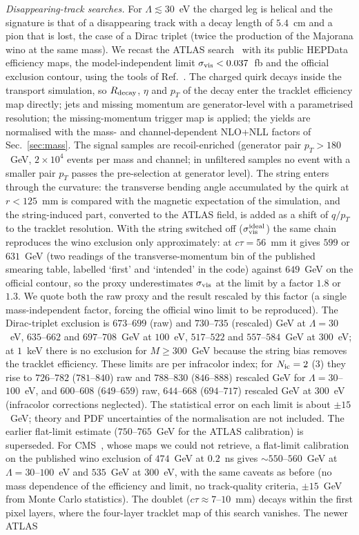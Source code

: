 \documentclass[prd,twocolumn,nofootinbib,superscriptaddress,amsmath,amssymb]{revtex4-2}
\begin{document}
\emph{Disappearing-track searches.} For $\Lambda\lesssim30$~eV the charged leg is helical and the signature is that of a disappearing track with a decay length of $5.4$~cm and a pion that is lost, the case of a Dirac triplet (twice the production of the Majorana wino at the same mass). We recast the ATLAS search~\cite{ATLAS:DT} with its public HEPData efficiency maps, the model-independent limit $\sigma_{\rm vis}<0.037$~fb and the official exclusion contour, using the tools of Ref.~\cite{RecastingCodes}. The charged quirk decays inside the transport simulation, so $R_{\rm decay}$, $\eta$ and $p_T$ of the decay enter the tracklet efficiency map directly; jets and missing momentum are generator-level with a parametrised resolution; the missing-momentum trigger map is applied; the yields are normalised with the mass- and channel-dependent NLO+NLL factors of Sec.~\ref{sec:mass}. The signal samples are recoil-enriched (generator pair $p_T>180$~GeV, $2\times10^4$ events per mass and channel; in unfiltered samples no event with a smaller pair $p_T$ passes the pre-selection at generator level). The string enters through the curvature: the transverse bending angle accumulated by the quirk at $r<125$~mm is compared with the magnetic expectation of the simulation, and the string-induced part, converted to the ATLAS field, is added as a shift of $q/p_T$ to the tracklet resolution. With the string switched off ($\sigma_{\rm vis}^{\rm ideal}$) the same chain reproduces the wino exclusion only approximately: at $c\tau=56$~mm it gives $599$ or $631$~GeV (two readings of the transverse-momentum bin of the published smearing table, labelled `first' and `intended' in the code) against $649$~GeV on the official contour, so the proxy underestimates $\sigma_{\rm vis}$ at the limit by a factor $1.8$ or $1.3$. We quote both the raw proxy and the result rescaled by this factor (a single mass-independent factor, forcing the official wino limit to be reproduced). The Dirac-triplet exclusion is $673$--$699$ (raw) and $730$--$735$ (rescaled) GeV at $\Lambda=30$~eV, $635$--$662$ and $697$--$708$~GeV at $100$~eV, $517$--$522$ and $557$--$584$~GeV at $300$~eV; at $1$~keV there is no exclusion for $M\ge300$~GeV because the string bias removes the tracklet efficiency. These limits are per infracolor index; for $N_{\rm ic}=2$ ($3$) they rise to $726$--$782$ ($781$--$840$) raw and $788$--$830$ ($846$--$888$) rescaled GeV for $\Lambda=30$--$100$~eV, and $600$--$608$ ($649$--$659$) raw, $644$--$668$ ($694$--$717$) rescaled GeV at $300$~eV (infracolor corrections neglected). The statistical error on each limit is about $\pm15$~GeV; theory and PDF uncertainties of the normalisation are not included. The earlier flat-limit estimate ($750$--$765$~GeV for the ATLAS calibration) is superseded. For CMS~\cite{CMS:DT}, whose maps we could not retrieve, a flat-limit calibration on the published wino exclusion of $474$~GeV at $0.2$~ns gives $\sim550$--$560$~GeV at $\Lambda=30$--$100$~eV and $535$~GeV at $300$~eV, with the same caveats as before (no mass dependence of the efficiency and limit, no track-quality criteria, $\pm15$~GeV from Monte Carlo statistics). The doublet ($c\tau\approx7$--$10$~mm) decays within the first pixel layers, where the four-layer tracklet map of this search vanishes. The newer ATLAS 
\end{document}
